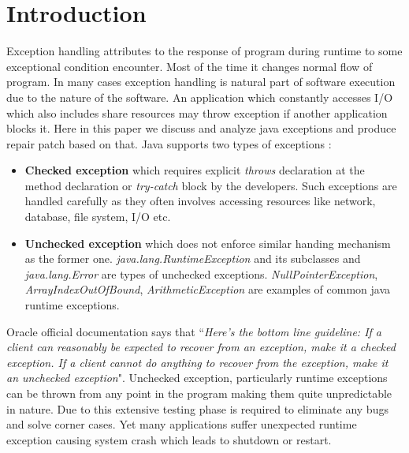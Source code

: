 

\chapter{Introduction}
\label{chapter:introduction}

Exception handling attributes to the response of program during runtime to some
exceptional condition encounter. Most of the time it changes normal flow of
program. In many cases exception handling is natural part of software execution
due to the nature of the software.
An application which constantly accesses I/O which also includes share resources
may throw exception if another application blocks it.
Here in this paper we discuss and analyze java exceptions and produce repair
patch based on that. Java supports two types of exceptions :

\begin{itemize}
  
  \item \textbf{Checked exception} which requires explicit \emph{throws}
  declaration at the method declaration or \emph{try-catch} block by the
  developers. Such exceptions are handled carefully as they often involves
  accessing resources like network, database, file system, I/O etc.
  
  \item \textbf{Unchecked exception} which does not enforce similar handing
  mechanism as the former one. \emph{java.lang.RuntimeException} and its
  subclasses and \emph{java.lang.Error} are types of unchecked exceptions.
  \emph{NullPointerException}, \emph{ArrayIndexOutOfBound},
  \emph{ArithmeticException} are examples of common java runtime exceptions.
  
\end{itemize}

Oracle official documentation says that ``\emph{Here's the bottom line
guideline: If a client can reasonably be expected to recover from an exception,
make it a checked exception. If a client cannot do anything to recover from the
exception, make it an unchecked exception}".
Unchecked exception, particularly runtime exceptions can be thrown from any
point in the program making them quite unpredictable in nature.
Due to this extensive testing phase is required to eliminate any bugs and solve
corner cases.
Yet many applications suffer unexpected runtime exception causing system crash
which leads to shutdown or restart.

